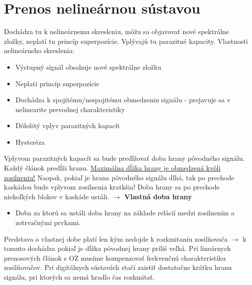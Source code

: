 \section{Prenos nelineárnou sústavou}
Dochádza tu k nelineárnemu skresleniu, môžu sa objavovať nové spektrálne zložky, neplatí tu princíp superpozície. Vplývajú tu parazitné kapacity. Vlastnosti nelineárneho skreslenia:
\begin{itemize}
\item Výstupný signál obsahuje nové spektrálne zložku
\item Neplatí princíp superpozície
\item Dochádza k spojitému/nespojitému obmedzeniu signálu - prejavuje sa v nelinearite prevodnej charakteristiky
\item Dôležitý vplyv parazitných kapacít
\item Hysteréza
\end{itemize}
Vplyvom parazitných kapacít sa bude predlžovať doba hrany pôvodného signálu. Každý článok predĺži hranu. 
\underline{Maximálna dĺžka hrany je obmedzená kvôli zosilneniu!} Naopak, pokiaľ je hrana pôvodného signálu dlhá, tak po prechode kaskádou bude vplyvom zosilnenia kratkšia! Doba hrany sa po prechode niekoľkých blokov v kaskáde ustáli. $\rightarrow$ \textbf{Vlastná doba hrany}
\begin{itemize}
	\item Doba za ktorú sa ustáli doba hrany na základe relácií medzi zosilnením a zotrvačnými prvkami.
\end{itemize}

Predstava o vlastnej dobe platí len kým nedojde k rozkmitaniu zosilňovača $\rightarrow$ k tomuto dochádza pokiaľ je dĺžka pôvodnej hrany príliš veľká. Pri lineárnych prenosových článok s OZ musíme kompenzovať frekvenčnú charakteristiku zosilňovačov. Pri digitálnych sústavách stačí zaistiť dostatočne krátku hranu signálu, pri ktorých sa nemá hradlo čas rozkmitať.

